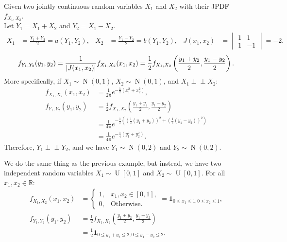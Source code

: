 \documentclass{huhtakm-template-book-v2}
\newcommand{\independent}{\perp\!\!\!\perp}
\DeclareMathOperator{\U}{U}
\DeclareMathOperator{\N}{N}
\begin{document}
    \begin{eg}
        Given two jointly continuous random variables $X_{1}$ and $X_{2}$ with their JPDF $f_{X_{1},X_{2}}$.\\
        Let $Y_{1} = X_{1}+X_{2}$ and $Y_{2} = X_{1}-X_{2}$.
        \begin{align*}
            X_{1} &= \frac{Y_{1}+Y_{2}}{2} = a(Y_{1},Y_{2}), & X_{2} &= \frac{Y_{1}-Y_{2}}{2} = b(Y_{1},Y_{2}), & J(x_{1},x_{2}) &= \begin{vmatrix}
                1 & 1\\
                1 & -1
            \end{vmatrix} = -2.
        \end{align*}
        \begin{equation*}
            f_{Y_{1},Y_{2}}(y_{1},y_{2}) = \frac{1}{\left|{J(x_{1},x_{2})}\right|}f_{X_{1},X_{2}}(x_{1},x_{2}) = \frac{1}{2}f_{X_{1},X_{2}}\left(\frac{y_{1}+y_{2}}{2},\frac{y_{1}-y_{2}}{2}\right).
        \end{equation*}
        More specifically, if $X_{1} \sim \N(0,1)$, $X_{2} \sim \N(0,1)$, and $X_{1} \independent X_{2}$:
        \begin{align*}
            f_{X_{1},X_{2}}(x_{1},x_{2}) &= \frac{1}{2\pi}e^{-\frac{1}{2}(x_{1}^{2}+x_{2}^{2})},\\
            f_{Y_{1},Y_{2}}(y_{1},y_{2}) &= \frac{1}{2}f_{X_{1},X_{2}}\left(\frac{y_{1}+y_{2}}{2},\frac{y_{1}-y_{2}}{2}\right)\\
            &= \frac{1}{4\pi}e^{-\frac{1}{2}\left(\left(\frac{1}{2}(y_{1}+y_{2})\right)^{2}+\left(\frac{1}{2}(y_{1}-y_{2})\right)^{2}\right)}\\
            &= \frac{1}{4\pi}e^{-\frac{1}{4}(y_{1}^{2}+y_{2}^{2})}.
        \end{align*}
        Therefore, $Y_{1} \independent Y_{2}$, and we have $Y_{1} \sim \N(0,2)$ and $Y_{2} \sim \N(0,2)$.
    \end{eg}
    \begin{eg}
        We do the same thing as the previous example, but instead, we have two independent random variables $X_{1} \sim \U[0,1]$ and $X_{2} \sim \U[0,1]$. For all $x_{1},x_{2} \in \mathbb{R}$:
        \begin{align*}
            f_{X_{1},X_{2}}(x_{1},x_{2}) &= \begin{cases}
                1, &x_{1},x_{2} \in [0,1],\\
                0, &\text{Otherwise}.
            \end{cases} = \mathbf{1}_{0 \leq x_{1} \leq 1,0 \leq x_{2} \leq 1},\\
            f_{Y_{1},Y_{2}}(y_{1},y_{2}) &= \frac{1}{2}f_{X_{1},X_{2}}\left(\frac{y_{1}+y_{2}}{2},\frac{y_{1}-y_{2}}{2}\right)\\
            &= \frac{1}{2}\mathbf{1}_{0 \leq y_{1}+y_{2} \leq 2,0 \leq y_{1}-y_{2} \leq 2}.
        \end{align*}
    \end{eg}
\end{document}
